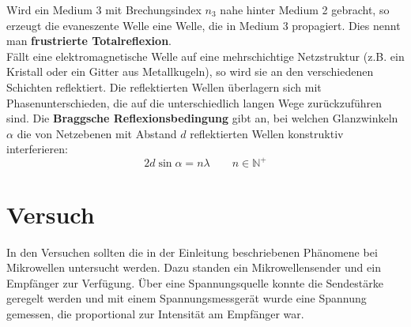 Wird ein Medium 3 mit Brechungsindex $n_3$ nahe hinter Medium 2 gebracht, so erzeugt die evaneszente Welle eine Welle, die in Medium 3 propagiert. Dies nennt man \textbf{frustrierte Totalreflexion}.\\

Fällt eine elektromagnetische Welle auf eine mehrschichtige Netzstruktur (z.B. ein Kristall oder ein Gitter aus Metallkugeln), so wird sie an den verschiedenen Schichten reflektiert. Die reflektierten Wellen überlagern sich mit Phasenunterschieden, die auf die unterschiedlich langen Wege zurückzuführen sind. Die \textbf{Braggsche Reflexionsbedingung} gibt an, bei welchen Glanzwinkeln $\alpha$ die von Netzebenen mit Abstand $d$ reflektierten Wellen konstruktiv interferieren:
\begin{equation}
	2d\sin{\alpha}=n\lambda\qquad n\in\mathbb{N^+}
\label{eq:bragg}
\end{equation}

\section{Versuch}
In den Versuchen sollten die in der Einleitung beschriebenen Phänomene bei Mikrowellen untersucht werden. Dazu standen ein Mikrowellensender und ein Empfänger zur Verfügung. Über eine Spannungsquelle konnte die Sendestärke geregelt werden und mit einem Spannungsmessgerät wurde eine Spannung gemessen, die proportional zur Intensität am Empfänger war. 
